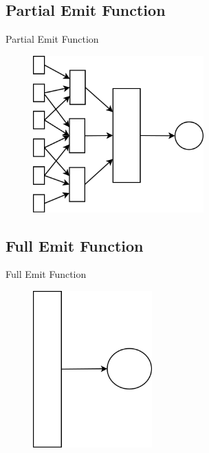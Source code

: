 \documentclass{beamer}
\begin{document}
\subsection*{Partial Emit Function}

\begin{frame}{Partial Emit Function}
\begin{figure}[H]
	\begin{center}
  		\includegraphics[height=6cm]{PresentationPartial.png}
	\end{center}
\end{figure}
\end{frame}


\subsection*{Full Emit Function}

\begin{frame}{Full Emit Function}
\begin{figure}[H]
	\begin{center}
  		\includegraphics[height=6cm]{PresentationFull.png}
	\end{center}
\end{figure}
\end{frame}
\end{document}
